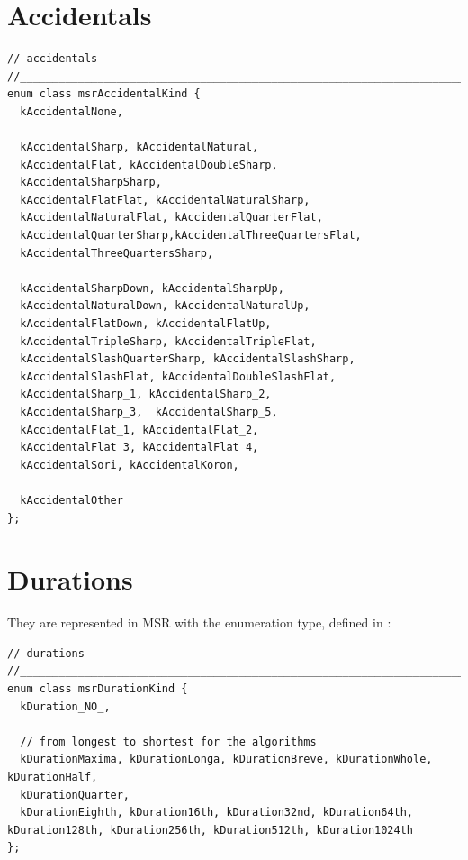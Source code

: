 \section{Accidentals}\label{Accidentals}

\begin{lstlisting}[language=CPlusPlus]
// accidentals
//______________________________________________________________________________
enum class msrAccidentalKind {
  kAccidentalNone,

  kAccidentalSharp, kAccidentalNatural,
  kAccidentalFlat, kAccidentalDoubleSharp,
  kAccidentalSharpSharp,
  kAccidentalFlatFlat, kAccidentalNaturalSharp,
  kAccidentalNaturalFlat, kAccidentalQuarterFlat,
  kAccidentalQuarterSharp,kAccidentalThreeQuartersFlat,
  kAccidentalThreeQuartersSharp,

  kAccidentalSharpDown, kAccidentalSharpUp,
  kAccidentalNaturalDown, kAccidentalNaturalUp,
  kAccidentalFlatDown, kAccidentalFlatUp,
  kAccidentalTripleSharp, kAccidentalTripleFlat,
  kAccidentalSlashQuarterSharp, kAccidentalSlashSharp,
  kAccidentalSlashFlat, kAccidentalDoubleSlashFlat,
  kAccidentalSharp_1, kAccidentalSharp_2,
  kAccidentalSharp_3,  kAccidentalSharp_5,
  kAccidentalFlat_1, kAccidentalFlat_2,
  kAccidentalFlat_3, kAccidentalFlat_4,
  kAccidentalSori, kAccidentalKoron,

  kAccidentalOther
};
\end{lstlisting}


\section{Durations}\label{Durations}

They are represented in MSR with the  enumeration type, defined in :
\begin{lstlisting}[language=CPlusPlus]
// durations
//______________________________________________________________________________
enum class msrDurationKind {
  kDuration_NO_,

  // from longest to shortest for the algorithms
  kDurationMaxima, kDurationLonga, kDurationBreve, kDurationWhole, kDurationHalf,
  kDurationQuarter,
  kDurationEighth, kDuration16th, kDuration32nd, kDuration64th, kDuration128th, kDuration256th, kDuration512th, kDuration1024th
};
\end{lstlisting}

